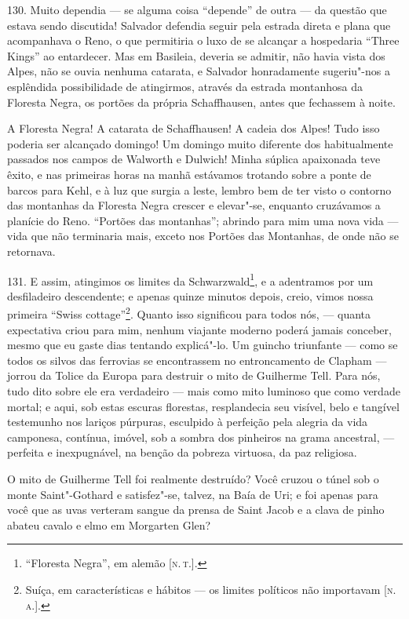 130. Muito dependia --- se alguma coisa ``depende'' de outra --- da
questão que estava sendo discutida! Salvador defendia seguir pela
estrada direta e plana que acompanhava o Reno, o que permitiria o luxo
de se alcançar a hospedaria ``Three Kings'' ao entardecer. Mas em
Basileia, deveria se admitir, não havia vista dos Alpes, não se ouvia
nenhuma catarata, e Salvador honradamente sugeriu"-nos a esplêndida
possibilidade de atingirmos, através da estrada montanhosa da Floresta
Negra, os portões da própria Schaffhausen, antes que fechassem à noite.

A Floresta Negra! A catarata de Schaffhausen! A cadeia dos Alpes! Tudo
isso poderia ser alcançado domingo! Um domingo muito diferente dos
habitualmente passados nos campos de Walworth e Dulwich! Minha súplica
apaixonada teve êxito, e nas primeiras horas na manhã estávamos trotando
sobre a ponte de barcos para Kehl, e à luz que surgia a leste, lembro
bem de ter visto o contorno das montanhas da Floresta Negra crescer e
elevar"-se, enquanto cruzávamos a planície do Reno. ``Portões das
montanhas''; abrindo para mim uma nova vida --- vida que não terminaria
mais, exceto nos Portões das Montanhas, de onde não se retornava.

131. E assim, atingimos os limites da Schwarzwald\footnote{``Floresta
  Negra'', em alemão {[}\textsc{n.\,t.}{]}.}, e a adentramos por um
desfiladeiro descendente; e apenas quinze minutos depois, creio, vimos
nossa primeira ``Swiss cottage''\footnote{Suíça, em características e
  hábitos --- os limites políticos não importavam {[}\textsc{n.\,a.}{]}.}.
Quanto isso significou para todos nós, --- quanta expectativa criou para
mim, nenhum viajante moderno poderá jamais conceber, mesmo que eu gaste
dias tentando explicá"-lo. Um guincho triunfante --- como se todos os
silvos das ferrovias se encontrassem no entroncamento de Clapham ---
jorrou da Tolice da Europa para destruir o mito de Guilherme Tell. Para
nós, tudo dito sobre ele era verdadeiro --- mais como mito luminoso que
como verdade mortal; e aqui, sob estas escuras florestas, resplandecia
seu visível, belo e tangível testemunho nos lariços púrpuras, esculpido
à perfeição pela alegria da vida camponesa, contínua, imóvel, sob a
sombra dos pinheiros na grama ancestral, --- perfeita e inexpugnável, na
benção da pobreza virtuosa, da paz religiosa.

O mito de Guilherme Tell foi realmente destruído? Você cruzou o túnel
sob o monte Saint"-Gothard e satisfez"-se, talvez, na Baía de Uri; e foi
apenas para você que as uvas verteram sangue da prensa de Saint Jacob e
a clava de pinho abateu cavalo e elmo em Morgarten Glen?

